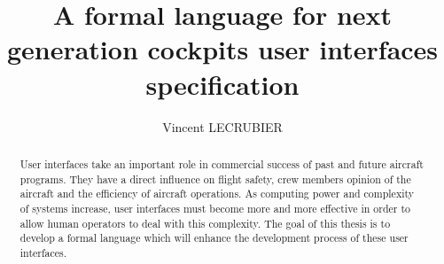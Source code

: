 \documentclass{jdt-tis}
\begin{document}
\title{A formal language for next generation cockpits user interfaces specification}
\author{Vincent LECRUBIER} 
 

\maketitle

\begin{abstract}
  User interfaces take an important role in commercial success of past and future aircraft programs. They have a direct influence on flight safety, crew members opinion of the aircraft and the efficiency of aircraft operations. 
As computing power and complexity of systems increase, user interfaces must become more and more effective in order to allow human operators to deal with this complexity. The goal of this thesis is to develop a formal language which will enhance the development process of these user interfaces.
\end{abstract}
\end{document}
